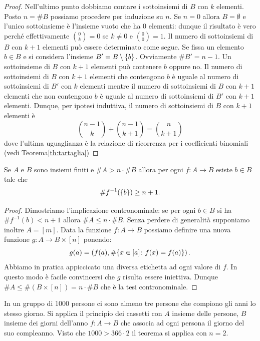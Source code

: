 \begin{proof}
Nell'ultimo punto dobbiamo contare i sottoinsiemi di $B$ con $k$ elementi.
Posto $n=\#B$ possiamo procedere per induzione su $n$.
Se $n=0$ allora $B=\emptyset$ e l'unico sottoinsieme 
è l'insieme vuoto che ha $0$ elementi: dunque
il risultato è vero perché effettivamente $\binom{0}{k} = 0$ se $k\neq 0$ e $\binom{0}{0}=1$.
Il numero di sottoinsiemi di $B$ con $k+1$ elementi 
può essere determinato come segue.
Se fissa un elemento $b\in B$ e si considera l'insieme 
$B'=B\setminus {\left\{ b \right\}}$. Ovviamente $\#B' = n-1$.
Un sottoinsieme di $B$ con $k+1$ elementi può contenere $b$ 
oppure no. 
Il numero di sottoinsiemi di $B$ con $k+1$ elementi che contengono $b$
è uguale al numero di sottoinsiemi di $B'$ con $k$ elementi
mentre il numero di sottoinsiemi di $B$ con $k+1$ elementi che non contengono $b$
è uguale al numero di sottoinsiemi di $B'$ con $k+1$ elementi.
Dunque, per ipotesi induttiva, il numero di sottoinsiemi di $B$ con $k+1$ elementi è
\[
  \binom{n-1}{k} + \binom{n-1}{k+1} = \binom{n}{k+1}
\]
dove l'ultima uguaglianza è la relazione di ricorrenza per i coefficienti binomiali
(vedi Teorema\ref{th:tartaglia})
\end{proof}

\begin{theorem}
Se $A$ e $B$ sono insiemi finiti e $\#A > n\cdot \#B$ allora 
per ogni $f\colon A \to B$ esiste $b\in B$ tale che 
\[
 \# f^{-1}({\left\{ b \right\}}) \ge n+1.
\]
\end{theorem}
\begin{proof}
Dimostriamo l'implicazione contronominale: se per ogni $b\in B$ si ha $\# f^{-1}(b) < n+1$
allora $\#A \le n\cdot \#B$.
Senza perdere di generalità supponiamo inoltre $A=[m]$.
Data la funzione $f\colon A\to B$ possiamo definire una nuova funzione $g\colon A\to B\times[n]$ 
ponendo:
\[
  g(a) = \left(f(a),\# {\left\{ x\in [a]\colon f(x)=f(a) \right\}}\right).
\]
Abbiamo in pratica appiccicato una diversa etichetta ad ogni valore di $f$. 
In questo modo è facile convincersi che $g$ risulta essere iniettiva.
Dunque $\#A \le \#(B\times [n]) = n\cdot \# B$ che è la tesi contronominale.
\end{proof}

\begin{example}
In un gruppo di 1000 persone ci sono almeno tre persone che compiono gli anni lo stesso giorno.
Si applica il principio dei cassetti con $A$ insieme delle persone, 
$B$ insieme dei giorni dell'anno $f\colon A\to B$ che associa ad ogni persona il giorno
del suo compleanno. Visto che $1000 > 366 \cdot 2$ il teorema si applica con $n=2$.
\end{example}


